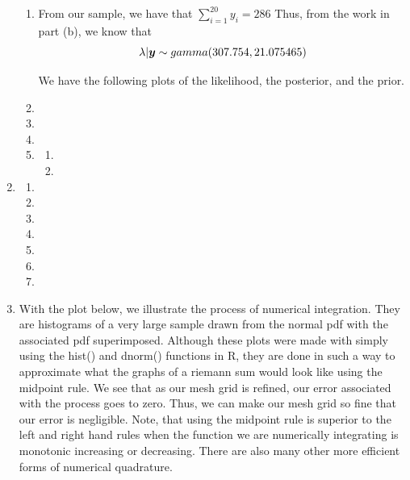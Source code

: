 \documentclass[12pt]{article}\usepackage[]{graphicx}\usepackage[]{color}
\newenvironment{knitrout}{}{} %
\newcommand{\bfy}{\mbox{\boldmath $y$}}
\begin{document}
\begin{enumerate}
\begin{enumerate}[label = (\alph*)]
\item From our sample, we have that $\sum_{i=1}^{20} y_i= 286$ Thus, from the work in part (b), we know that 
\[ \lambda | \bfy \sim gamma(307.754, 21.075465) \]

We have the following plots of the likelihood, the posterior, and the prior.

\item

\item

\item


\item
\begin{enumerate}[label = \roman*.]
\item
\item
\end{enumerate}
\end{enumerate}

\item
\begin{enumerate}[label = (\alph*)]
\item
\item
\item
\item
\item
\item
\item
\end{enumerate}

\item
With the plot below, we illustrate the process of numerical integration. They are histograms of a very large sample drawn from the normal pdf with the associated pdf superimposed. Although these plots were made  with simply using the hist() and dnorm() functions in R, they are done in such a way to approximate what the graphs of a riemann sum would look like using the midpoint rule. We see that as our mesh grid is refined, our error associated with the process goes to zero. Thus, we can make our mesh grid so fine that our error is negligible. Note, that using the midpoint rule is superior to the left and right hand rules when the function we are numerically integrating is monotonic increasing or decreasing. There are also many other more efficient forms of numerical quadrature. 

\begin{knitrout}
\color{fgcolor}


\end{knitrout}
\end{enumerate}
\end{document}
